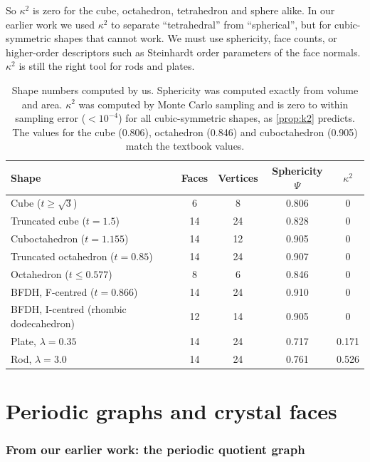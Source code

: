 \documentclass[11pt,a4paper]{article}
\theoremstyle{remark}\newtheorem*{example}{Worked example}
\begin{document}
\begin{careful}
So $\kappa^2$ is zero for the cube, octahedron, tetrahedron and sphere alike. In our earlier work we used $\kappa^2$ to separate ``tetrahedral'' from ``spherical'', but for cubic-symmetric shapes that cannot work. We must use sphericity, face counts, or higher-order descriptors such as Steinhardt order parameters of the face normals. $\kappa^2$ is still the right tool for rods and plates.
\end{careful}

\begin{table}[H]\centering\small
\begin{tabular}{lcccc}
\toprule
Shape & Faces & Vertices & Sphericity $\Psi$ & $\kappa^2$\\
\midrule
Cube ($t\ge\sqrt3$) & 6 & 8 & 0.806 & 0\\
Truncated cube ($t=1.5$) & 14 & 24 & 0.828 & 0\\
Cuboctahedron ($t=1.155$) & 14 & 12 & 0.905 & 0\\
Truncated octahedron ($t=0.85$) & 14 & 24 & 0.907 & 0\\
Octahedron ($t\le0.577$) & 8 & 6 & 0.846 & 0\\
BFDH, F-centred ($t=0.866$) & 14 & 24 & 0.910 & 0\\
BFDH, I-centred (rhombic dodecahedron) & 12 & 14 & 0.905 & 0\\
Plate, $\lambda=0.35$ & 14 & 24 & 0.717 & 0.171\\
Rod, $\lambda=3.0$ & 14 & 24 & 0.761 & 0.526\\
\bottomrule
\end{tabular}
\caption{Shape numbers computed by us. Sphericity was computed exactly from volume and area. $\kappa^2$ was computed by Monte Carlo sampling and is zero to within sampling error ($<10^{-4}$) for all cubic-symmetric shapes, as \autoref{prop:k2} predicts. The values for the cube (0.806), octahedron (0.846) and cuboctahedron (0.905) match the textbook values.}
\label{tab:shapes}
\end{table}

\part{Periodic graphs and crystal faces}
\section{From our earlier work: the periodic quotient graph}\label{sec:graph}
\end{document}

